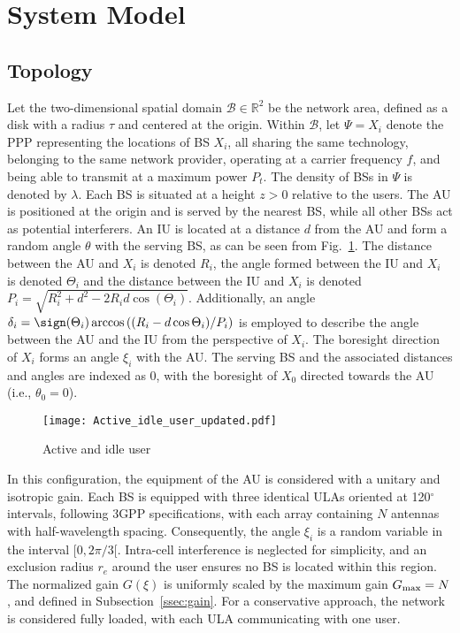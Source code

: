\section{System Model}
\label{sec:system_model}

\subsection{Topology}
\label{ssec:topology}
Let the two-dimensional spatial domain $\mathcal{B} \in \mathbb{R}^2$ be the network area, defined as a disk with a radius $\tau$ and centered at the origin. Within $\mathcal{B}$, let $\Psi = {X_i}$ denote the PPP representing the locations of BS $X_i$, all sharing the same technology, belonging to the same network provider, operating at a carrier frequency $f$, and being able to transmit at a maximum power $P_t$. The density of BSs in $\Psi$ is denoted by $\lambda$. Each BS is situated at a height $z > 0$ relative to the users. The AU is positioned at the origin and is served by the nearest BS, while all other BSs act as potential interferers. An IU is located at a distance $d$ from the AU and form a random angle $\theta$ with the serving BS, as can be seen from Fig.~\ref{fig:Active and idle user}. The distance between the AU and $X_i$ is denoted $R_i$, the angle formed between the IU and $X_i$ is denoted $\Theta_i$ and the distance between the IU and $X_i$ is denoted $P_i = \sqrt{R_i^2+d^2-2R_i d \cos(\Theta_i)}$. Additionally, an angle $\delta_i = \sign(\Theta_i) \arccos\left((R_i - d \cos \Theta_i)/P_i\right)$ is employed to describe the angle between the AU and the IU from the perspective of $X_i$. The boresight direction of $X_i$ forms an angle $\xi_i$ with the AU. The serving BS and the associated distances and angles are indexed as $0$, with the boresight of $X_0$ directed towards the AU (i.e., $\theta_0 = 0$).
\begin{figure}
    \centering
    \texttt{[image: Active\_idle\_user\_updated.pdf]}
    \caption{Active and idle user}
    \label{fig:Active and idle user}
\end{figure}  
In this configuration, the equipment of the AU is considered with a unitary and isotropic gain. Each BS is equipped with three identical ULAs oriented at 120$^\circ$ intervals, following 3GPP specifications, with each array containing $N$ antennas with half-wavelength spacing. Consequently, the angle $\xi_i$ is a random variable in the interval $[0,2\pi/3[$. Intra-cell interference is neglected for simplicity, and an exclusion radius $r_e$ around the user ensures no BS is located within this region. The normalized gain $G(\xi)$ is uniformly scaled by the maximum gain $G_{\textrm{\normalfont max}} = N$, and defined in Subsection~\ref{ssec:gain}. For a conservative approach, the network is considered fully loaded, with each ULA communicating with one user.

